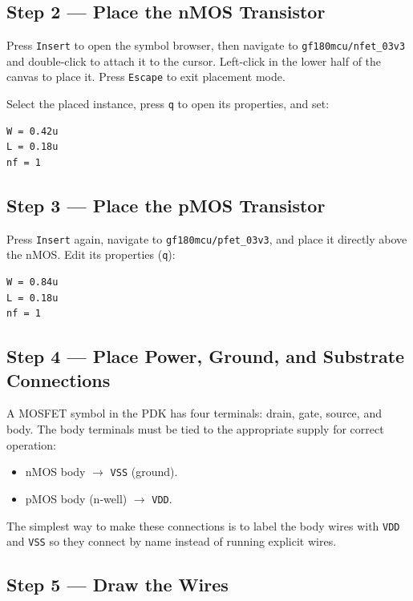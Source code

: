 \documentclass[11pt]{article}
\begin{document}
\subsection{Step 2 --- Place the nMOS Transistor}

Press \texttt{Insert} to open the symbol browser, then navigate to
\texttt{gf180mcu/nfet\_03v3} and double-click to attach it to the
cursor.
Left-click in the lower half of the canvas to place it.
Press \texttt{Escape} to exit placement mode.

Select the placed instance, press \texttt{q} to open its properties,
and set:

\begin{lstlisting}
W = 0.42u
L = 0.18u
nf = 1
\end{lstlisting}

\subsection{Step 3 --- Place the pMOS Transistor}

Press \texttt{Insert} again, navigate to \texttt{gf180mcu/pfet\_03v3},
and place it directly above the nMOS.
Edit its properties (\texttt{q}):

\begin{lstlisting}
W = 0.84u
L = 0.18u
nf = 1
\end{lstlisting}

\subsection{Step 4 --- Place Power, Ground, and Substrate Connections}

A MOSFET symbol in the PDK has four terminals: drain, gate, source, and
body.
The body terminals must be tied to the appropriate supply for correct
operation:

\begin{itemize}[leftmargin=2em]
  \item nMOS body $\rightarrow$ \texttt{VSS} (ground).
  \item pMOS body (n-well) $\rightarrow$ \texttt{VDD}.
\end{itemize}

The simplest way to make these connections is to label the body wires
with \texttt{VDD} and \texttt{VSS} so they connect by name instead of
running explicit wires.

\subsection{Step 5 --- Draw the Wires}
\end{document}
